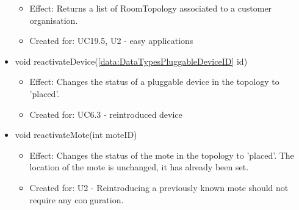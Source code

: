 \begin{description}
\begin{itemize}[noitemsep,nolistsep,leftmargin=-.25cm]
        \begin{itemize}[noitemsep,nolistsep]
           \item Effect: Returns a list of RoomTopology associated to a customer organisation.
\item Created for: UC19.5, U2 - easy applications
        \end{itemize}
      \item \textsf{void reactivateDevice(\ref{data:DataTypesPluggableDeviceID} id)}
        \begin{itemize}[noitemsep,nolistsep]
           \item Effect: Changes the status of a pluggable device in the topology to 'placed'.
\item Created for: UC6.3 - reintroduced device
        \end{itemize}
      \item \textsf{void reactivateMote(int moteID)}
        \begin{itemize}[noitemsep,nolistsep]
           \item Effect: Changes the status of the mote in the topology to 'placed'. The location of the mote is unchanged, it has already been set.
\item Created for: U2 - Reintroducing a previously known mote should not require any conguration.
        \end{itemize}
    \end{itemize}
    \end{description}

